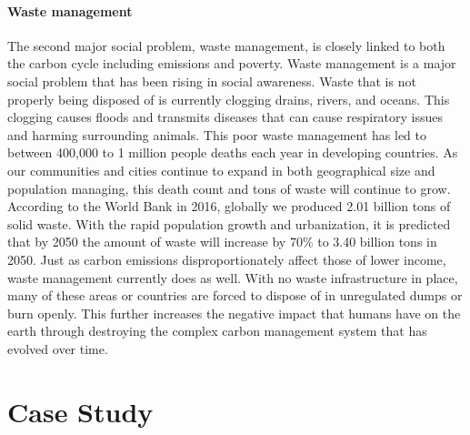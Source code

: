 \documentclass[3p,sort]{elsarticle}
\begin{document}
\paragraph{Waste management} The second major social problem, waste management, is closely linked 
to both the carbon cycle including emissions and poverty. Waste management is a major social problem
that has been rising in social awareness. Waste that is not properly being disposed of is currently 
clogging drains, rivers, and oceans. This clogging causes floods and transmits diseases that can 
cause respiratory issues and harming surrounding animals. This poor waste management has led to 
between 400,000 to 1 million people deaths each year in developing countries.  As our communities and 
cities continue to expand in both geographical size and population managing, this death count and tons 
of waste will continue to grow. According to the  World Bank in 2016, globally we produced 2.01 
billion tons of solid waste. With the rapid population growth and urbanization, it is predicted that 
by 2050 the amount of waste will increase by 70\% to 3.40 billion tons in 2050. Just as carbon 
emissions disproportionately affect those of lower income, waste management currently does as well. 
With no waste infrastructure in place, many of these areas or countries are forced to dispose of in 
unregulated dumps or burn openly. This further increases the negative impact that humans have on the 
earth through destroying the complex carbon management system that has evolved over time. 
\citep{waste, tearfund, worldbank}




\section{Case Study}
\end{document}
